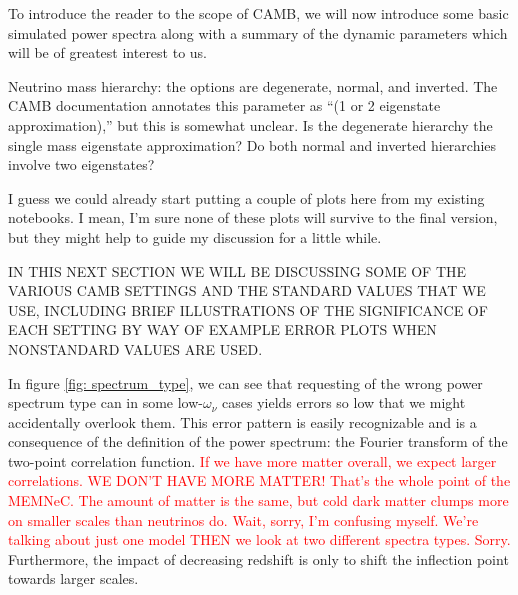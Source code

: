 \documentclass[11pt]{article}
\begin{document}
To introduce the reader to the scope of CAMB, we will now introduce
some basic simulated power spectra along with a summary of the dynamic
parameters which will be of greatest interest to us.

Neutrino mass hierarchy: the options are degenerate, normal, and inverted.
The CAMB documentation annotates this parameter as ``(1 or 2 eigenstate
approximation),'' but this is somewhat unclear. Is the degenerate
hierarchy the single mass eigenstate approximation? Do both normal
and inverted hierarchies involve two eigenstates?

I guess we could already start putting a couple of plots here from my existing
notebooks. I mean, I'm sure none of these plots will survive to the final
version, but they might help to guide my discussion for a little while.

IN THIS NEXT SECTION WE WILL BE DISCUSSING SOME OF THE VARIOUS CAMB SETTINGS
AND THE STANDARD VALUES THAT WE USE, INCLUDING BRIEF ILLUSTRATIONS OF THE
SIGNIFICANCE OF EACH SETTING BY WAY OF EXAMPLE ERROR PLOTS WHEN NONSTANDARD
VALUES ARE USED.

In figure \ref{fig: spectrum_type}, we can see that requesting of the wrong
power spectrum type can in some low-$\omega_\nu$ cases yields errors so low
that we might accidentally overlook them. This error pattern is easily
recognizable and is a consequence of the definition of the power spectrum: the
Fourier transform  of the two-point correlation function.
\textcolor{red}{If we
have more matter overall, we expect larger correlations.
WE DON'T HAVE MORE MATTER! That's the whole point of the MEMNeC. The amount of
matter is the same, but cold dark matter clumps more on smaller scales than
neutrinos do. Wait, sorry, I'm confusing myself. We're talking about just one
model THEN we look at two different spectra types. Sorry.
}
Furthermore, the impact of decreasing redshift is only to shift the inflection
point towards larger scales.
\end{document}
